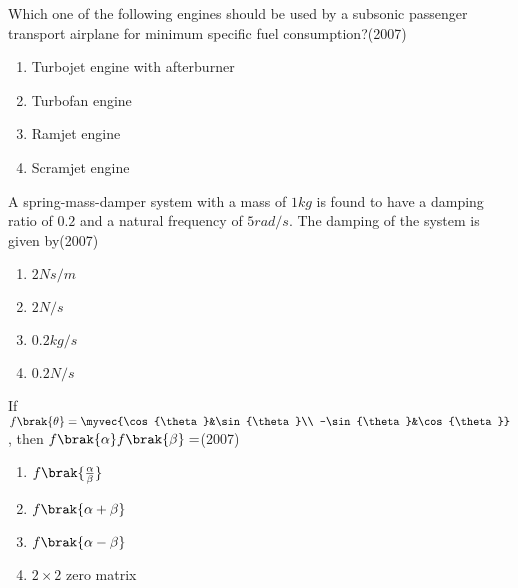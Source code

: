 \iffalse
\chapter{2007}
\author{AI24BTECH11022}
\section{ae}
\fi

\item Which one of the following engines should be used by a subsonic passenger transport airplane for minimum specific fuel consumption?\hfill(2007)
\begin{multicols}{2}
\begin{enumerate}
\item Turbojet engine with afterburner
\item Turbofan engine 
\item Ramjet engine
\item Scramjet engine
\end{enumerate}
\end{multicols}


\item A spring-mass-damper system with a mass of $1kg$ is found to have a damping ratio of $0.2$ and a natural frequency of $5rad/s$. The damping of the system is given by\hfill(2007)
\begin{multicols}{2}
\begin{enumerate}
\item $2Ns/m$
\item $2N/s$
\item $0.2kg/s$
\item $0.2N/s$
\end{enumerate}
\end{multicols}


\item If $f\brak{\theta}=\myvec{\cos{\theta}&\sin{\theta}\\ -\sin{\theta}&\cos{\theta}}$, then $f\brak{\alpha}f\brak{\beta}=$\hfill(2007)
\begin{multicols}{2}
\begin{enumerate}
\item $f\brak{\frac{\alpha}{\beta}}$
\item $f\brak{\alpha+\beta}$
\item $f\brak{\alpha-\beta}$
\item $2\times 2$ zero matrix 
\end{enumerate}
\end{multicols}


